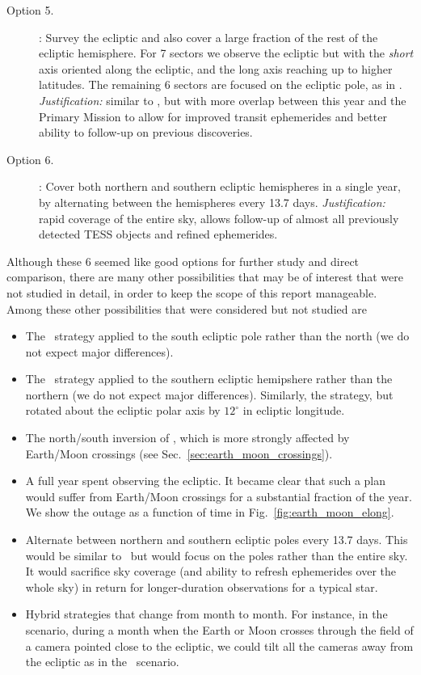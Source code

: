 \begin{description}
\item[Option 5.] \eshort: Survey the ecliptic and also cover a large
  fraction of the rest of the ecliptic hemisphere. For 7 sectors we
  observe the ecliptic but with the {\it short} axis oriented along
  the ecliptic, and the long axis reaching up to higher latitudes.
  The remaining 6 sectors are focused on the ecliptic pole, as in
  \elong.  \textit{Justification:} similar to \elong, but with more
  overlap between this year and the Primary Mission to allow for
  improved transit ephemerides and better ability to follow-up on
  previous discoveries.
  
\item[Option 6.] \hemis: Cover both northern and southern ecliptic
  hemispheres in a single year, by alternating between the hemispheres
  every 13.7 days.  \textit{Justification:} rapid coverage of the
  entire sky, allows follow-up of almost all previously detected TESS
  objects and refined ephemerides.

\end{description}

Although these 6 seemed like good options for further study and direct
comparison, there are many other possibilities that may be of interest
that were not studied in detail, in order to keep the scope of this
report manageable.  Among these other possibilities that were considered but not studied are
\begin{itemize}
	\item The \npole\, strategy applied to the south ecliptic pole rather than the north (we do not expect major differences).
	\item The \nhemi\, strategy applied to the southern ecliptic hemipshere rather than the northern (we do not expect major differences).
	Similarly, the \nhemi strategy, but rotated about the ecliptic polar axis by
	$12^\circ$ in ecliptic longitude.
	\item The north/south inversion of \shemiAvoid, which is more strongly affected by Earth/Moon crossings (see Sec.~\ref{sec:earth_moon_crossings}).
	\item A full year spent observing the ecliptic.  It became clear that such a plan would suffer from Earth/Moon crossings for a substantial fraction of the year.
	We show the outage as a function of time in Fig.~\ref{fig:earth_moon_elong}.
        \item Alternate between northern and southern ecliptic poles every 13.7 days.
        This would be similar to \hemis\, but would focus on the poles rather than the entire sky.
        It would sacrifice sky coverage (and ability to refresh ephemerides over the whole sky) in return for longer-duration observations for a typical star.
        \item Hybrid strategies that change from month to month.  For instance, in the \nhemi\, scenario, during a month when the Earth or Moon crosses through the field of a camera pointed close to the ecliptic, we could tilt all the cameras away from the ecliptic as in the \npole\, scenario.        
\end{itemize}
